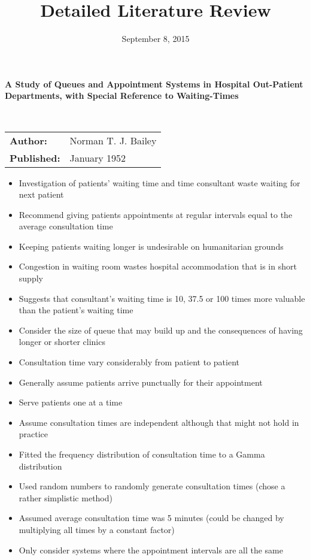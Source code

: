 \documentclass{article}
\title{Detailed Literature Review}
\author{}
\date{September 8, 2015}
\begin{document}
\maketitle

\textbf{A Study of Queues and Appointment Systems in Hospital Out-Patient Departments, with Special Reference to Waiting-Times}

\ \newline

\begin{tabular}{l l}
    \textbf{Author:} & Norman T. J. Bailey \\
    \textbf{Published:} & January 1952 \\
\end{tabular}

\begin{itemize}
	\item Investigation of patients' waiting time and time consultant waste waiting for next patient
    \item Recommend giving patients appointments at regular intervals equal to the average consultation time
    \item Keeping patients waiting longer is undesirable on humanitarian grounds
    \item Congestion in waiting room wastes hospital accommodation that is in short supply
    \item Suggests that consultant's waiting time is 10, 37.5 or 100 times more valuable than the patient's waiting time
    \item Consider the size of queue that may build up and the consequences of having longer or shorter clinics
    \item Consultation time vary considerably from patient to patient
    \item Generally assume patients arrive punctually for their appointment
    \item Serve patients one at a time
    \item Assume consultation times are independent although that might not hold in practice
    \item Fitted the frequency distribution of consultation time to a Gamma distribution
    \item Used random numbers to randomly generate consultation times (chose a rather simplistic method)
    \item Assumed average consultation time was 5 minutes (could be changed by multiplying all times by a constant factor)
    \item Only consider systems where the appointment intervals are all the same

\end{itemize}
\end{document}
